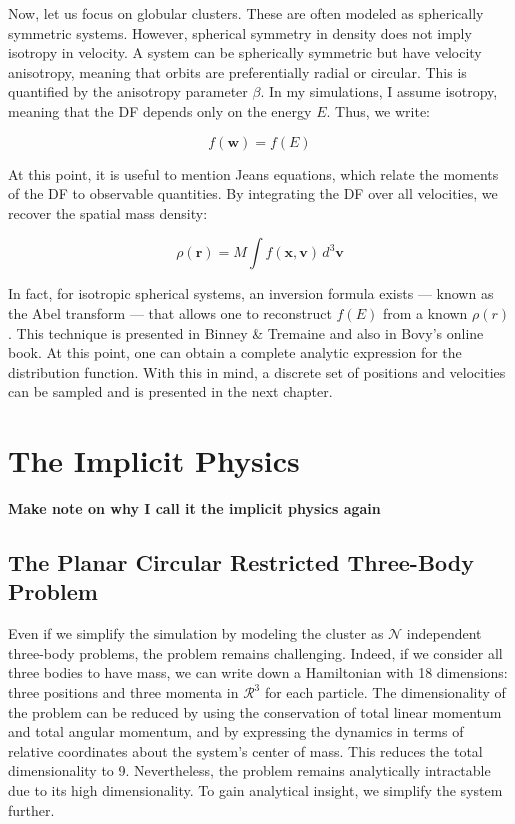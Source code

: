         Now, let us focus on globular clusters. These are often modeled as spherically symmetric systems. However, spherical symmetry in density does not imply isotropy in velocity. A system can be spherically symmetric but have velocity anisotropy, meaning that orbits are preferentially radial or circular. This is quantified by the anisotropy parameter \( \beta \). In my simulations, I assume isotropy, meaning that the DF depends only on the energy \( E \). Thus, we write:

        \[
        f(\mathbf{w}) = f(E)
        \]

        At this point, it is useful to mention Jeans equations, which relate the moments of the DF to observable quantities. By integrating the DF over all velocities, we recover the spatial mass density:

        \[
        \rho(\mathbf{r}) = M \int f(\mathbf{x}, \mathbf{v}) \, d^3\mathbf{v}
        \]

        In fact, for isotropic spherical systems, an inversion formula exists — known as the Abel transform — that allows one to reconstruct \( f(E) \) from a known \( \rho(r) \). This technique is presented in Binney \& Tremaine and also in Bovy's online book. At this point, one can obtain a complete analytic expression for the distribution function. With this in mind, a discrete set of positions and velocities can be sampled and is presented in the next chapter.

        



\section{The Implicit Physics}
    \textbf{Make note on why I call it the implicit physics again}
    \subsection{The Planar Circular Restricted Three-Body Problem}
        
        Even if we simplify the simulation by modeling the cluster as $\mathcal{N}$ independent three-body problems, the problem remains challenging. Indeed, if we consider all three bodies to have mass, we can write down a Hamiltonian with 18 dimensions: three positions and three momenta in $\mathcal{R}^3$ for each particle. The dimensionality of the problem can be reduced by using the conservation of total linear momentum and total angular momentum, and by expressing the dynamics in terms of relative coordinates about the system's center of mass. This reduces the total dimensionality to 9. Nevertheless, the problem remains analytically intractable due to its high dimensionality. To gain analytical insight, we simplify the system further.
        
